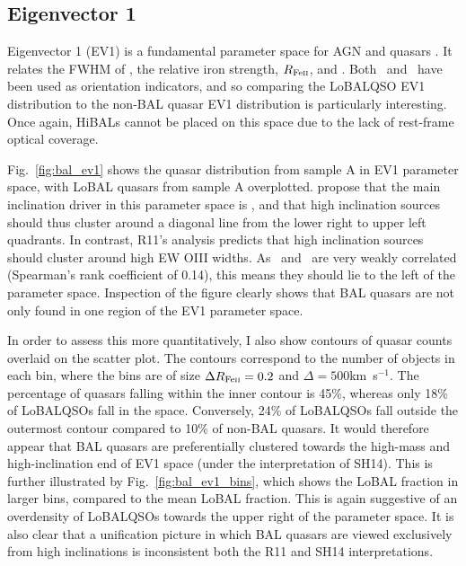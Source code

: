 \subsection{Eigenvector 1}

Eigenvector 1 (EV1) is a fundamental parameter space for AGN and quasars
\citep{borosongreen,sulentic2000ev1,marziani2001,shenho2014}. 
It relates the FWHM of \hb, the relative iron strength, 
$R_{{\rm Fe \textsc{ii}}}$, and
\ewo. Both \ewo\ and \fwh\ have been used as orientation
indicators, and so comparing the LoBALQSO EV1 distribution to the non-BAL 
quasar EV1 distribution is particularly interesting. Once again,
HiBALs cannot be placed on this space due to the lack of rest-frame 
optical coverage.

Fig.~\ref{fig:bal_ev1} shows the quasar distribution from sample A 
in EV1 parameter space, with LoBAL quasars from sample A overplotted.
\citet[][hereafter SH14]{shenho2014} propose 
that the main inclination driver in this parameter space
is \fwh, and that high inclination sources should thus cluster around
a diagonal line from the lower right to upper left quadrants. In contrast,
R11's analysis predicts that high inclination sources should cluster
around high EW OIII widths. As \ewo\ and \fwh\ are very weakly correlated
(Spearman's rank coefficient of 0.14), this means they should lie to
the left of the parameter space. Inspection of the figure clearly 
shows that BAL quasars are not only found in one region of the 
EV1 parameter space. 

In order to assess this more quantitatively, I also show contours of 
quasar counts overlaid on the scatter plot. The contours correspond
to the number of objects in each bin, where the bins are of size
$\Delta R_{{\rm Fe \textsc{ii}}} = 0.2$ and $\Delta$\fwh$=500$km~s$^{-1}$.
The percentage of quasars falling within the inner contour is 45\%, 
whereas only 18\% of LoBALQSOs fall in the space. Conversely, 24\% 
of LoBALQSOs fall outside the outermost contour compared to 10\% of 
non-BAL quasars. It would therefore appear that BAL 
quasars are preferentially clustered towards the high-mass and 
high-inclination end of EV1 space (under the interpretation of SH14).
This is further illustrated by Fig.~\ref{fig:bal_ev1_bins},
which shows the LoBAL fraction in larger bins, compared to the 
mean LoBAL fraction. This is again suggestive of an overdensity of LoBALQSOs 
towards the upper right of the parameter space.
It is also clear that a unification picture in which BAL 
quasars are viewed exclusively from high inclinations is 
inconsistent both the R11 and SH14 interpretations. 

